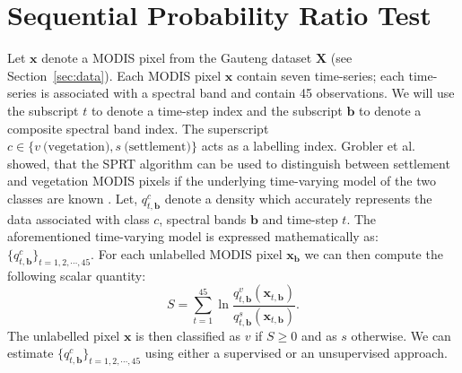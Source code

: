 \documentclass{article}
\begin{document}
\section{Sequential Probability Ratio Test}
\label{sec:sprt}
Let $\mathbf{x}$ denote a MODIS pixel from the Gauteng dataset $\mathbf{X}$ (see Section~\ref{sec:data}). Each MODIS pixel $\mathbf{x}$ contain seven time-series; each time-series is associated with a spectral band and contain 45 observations.
We will use the subscript $t$ to denote a time-step index and the subscript $\mathbf{b}$ to denote a composite spectral band index. The superscript $c\in\{v~\textrm{(vegetation)},s~\textrm{(settlement)}\}$ acts as a labelling index. Grobler et al. showed, that the SPRT algorithm can be used to distinguish between settlement and vegetation MODIS pixels if the underlying time-varying model of the two classes are known \cite{grobler2012c}. 
Let, $q_{t,\mathbf{b}}^c$ denote a density which accurately represents the data associated with class $c$, spectral bands $\mathbf{b}$ and time-step $t$. The aforementioned time-varying 
model is expressed mathematically as: $\{q_{t,\mathbf{b}}^c\}_{t=1,2,\cdots,45}$.
For each unlabelled MODIS pixel $\mathbf{x}_{\mathbf{b}}$ we can then compute the following scalar quantity: 
\begin{equation}
S = \sum_{t=1}^{45} \ln \frac{q_{t,\mathbf{b}}^v(\mathbf{x}_{t,\mathbf{b}})}{q_{t,\mathbf{b}}^s(\mathbf{x}_{t,\mathbf{b}})}. 
\end{equation}
The unlabelled pixel $\mathbf{x}$ is then classified as $v$ if $S\geq 0$ and as $s$ otherwise. We can estimate  $\{q_{t,\mathbf{b}}^c\}_{t=1,2,\cdots,45}$ using either a supervised or an unsupervised 
approach. 
\end{document}
